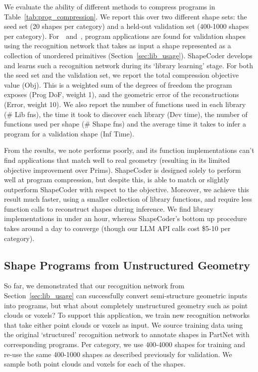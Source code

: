 We evaluate the ability of different methods to compress programs in Table~\ref{tab:prog_compression}.
We report this over two different shape sets: the seed set (20 shapes per category) and a held-out validation set (400-1000 shapes per category).
For~\methodname~and~\llmbaseline, program applications are found for validation shapes using the recognition network that takes as input a shape
represented
as a collection of unordered primitives (Section~\ref{sec:lib_usage}). 
ShapeCoder develops and learns such a recognition network during its `library learning' stage.
For both the seed set and the validation set, we report the total compression objective value (Obj).
This is a weighted sum of the degrees of freedom the program exposes (Prog DoF, weight 1),
and the geometric error of the reconstructions (Error, weight 10). 
We also report the number of functions used in each library (\# Lib fns), the time it took to discover each library (Dev time), the number of functions used per shape (\# Shape fns) and the average time it takes to infer a program for a validation shape (Inf Time).

From the results, we note \llmbaseline performs poorly, and its function implementations can't find applications that match well to real geometry (resulting in its limited objective improvement over Prims).
ShapeCoder is designed solely to perform well at program compression, but despite this, \methodname is able to match or slightly outperform ShapeCoder with respect to the objective.
Moreover, we achieve this result much faster, using a smaller collection of library functions, and require less function calls to reconstruct shapes during inference.
We find library implementations in under an hour, whereas ShapeCoder's bottom up procedure takes around a day to converge (though our LLM API calls cost \$5-10 per category).

\subsection{Shape Programs from Unstructured Geometry}
\label{sec:res_vpi}



So far, we demonstrated that our recognition network from Section~\ref{sec:lib_usage} can successfully convert semi-structure geometric inputs into programs, but what about completely unstructured geometry such as point clouds or voxels?
To support this application, we train new recognition networks that take either point clouds or voxels as input. We source training data using the original `structured' recognition network to annotate shapes in PartNet
with corresponding programs.
Per category, we use 400-4000 shapes for training and re-use the same 400-1000 shapes as described previously for validation.
We sample both point clouds and voxels for each of the shapes.


